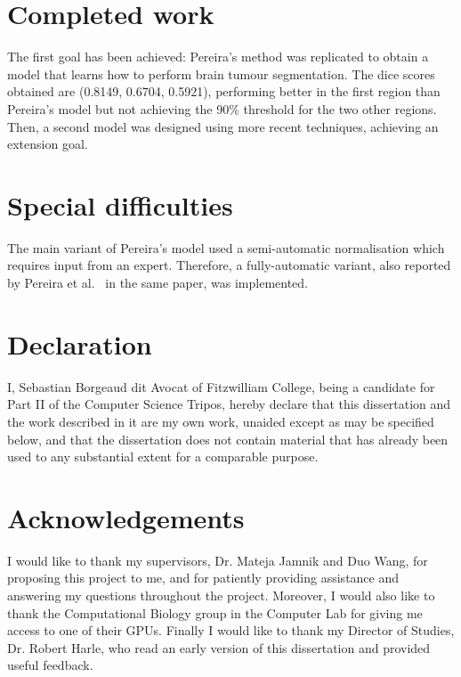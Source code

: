 \documentclass[12pt,a4paper,twoside,openright]{report}
\begin{document}
\section*{Completed work}
The first goal has been achieved: Pereira's method was replicated to obtain a model that learns how to perform brain tumour segmentation. The dice scores obtained are (0.8149, 0.6704, 0.5921), performing better in the first region than Pereira's model but not achieving the 90\% threshold for the two other regions. Then, a second model was designed using more recent techniques, achieving an extension goal.

\section*{Special difficulties}
The main variant of Pereira's model used a semi-automatic normalisation which requires input from an expert. Therefore, a fully-automatic variant, also reported by Pereira et al.\ \cite{pereira} in the same paper, was implemented.
\newpage
\section*{Declaration}

I, Sebastian Borgeaud dit Avocat of Fitzwilliam College, being a candidate for Part II of the Computer Science Tripos, hereby declare
that this dissertation and the work described in it are my own work,
unaided except as may be specified below, and that the dissertation
does not contain material that has already been used to any substantial
extent for a comparable purpose.

\bigskip
{}

\medskip
{}

\tableofcontents

\listoffigures

\newpage

\setlength{\parskip}{1em} %

\section*{Acknowledgements}
I would like to thank my supervisors, Dr. Mateja Jamnik and Duo Wang, for proposing this project to me, and for patiently providing assistance and answering my questions throughout the project. Moreover, I would also like to thank the Computational Biology group in the Computer Lab for giving me access to one of their GPUs. Finally I would like to thank my Director of Studies, Dr. Robert Harle, who read an early version of this dissertation and provided useful feedback. 
\end{document}
